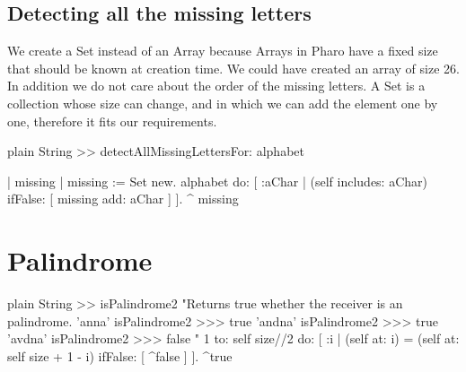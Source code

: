 \documentclass[10pt,twoside,english]{_support/latex/sbabook/sbabook}
\begin{document}
\subsection{Detecting all the missing letters}
We create a Set instead of an Array because Arrays in Pharo have a fixed size that should be known at creation time. We could have created an array of size 26. In addition we do not care about the order of the missing letters.
A Set is a collection whose size can change, and in which we can add the element one by one, therefore it fits our requirements. 

\begin{displaycode}{plain}
String >> detectAllMissingLettersFor: alphabet
	
	| missing |
	missing := Set new. 
	alphabet do: [ :aChar |
		(self includes: aChar)
			ifFalse: [ missing add: aChar ] ].
	^ missing
\end{displaycode}
\section{Palindrome}
\begin{displaycode}{plain}
String >> isPalindrome2
	"Returns true whether the receiver is an palindrome.
	'anna' isPalindrome2
	>>> true
	'andna' isPalindrome2 
	>>> true
	'avdna' isPalindrome2 
	>>> false
	"
	1 
		to: self size//2 
		do: [ :i | (self at: i) = (self at: self size + 1 - i)
						ifFalse: [ ^false ]
				].
	^true
\end{displaycode}


\backmatter



\end{document}
